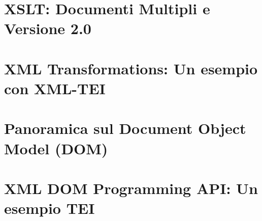\documentclass{beamer}
\begin{document}
    
    \section{XSLT: Documenti Multipli e Versione 2.0}
    
    
    \section{XML Transformations: Un esempio con XML-TEI}
    
    
    \section{Panoramica sul Document Object Model (DOM)}
    
    
    \section{XML DOM Programming API: Un esempio TEI}
    
    
    
\end{document}
